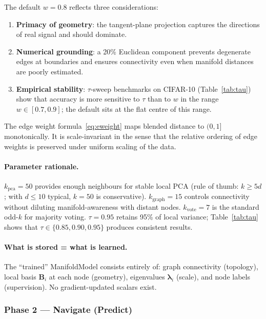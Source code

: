 \documentclass[12pt,letterpaper]{article}
\newcommand{\bB}{\mathbf{B}}
\begin{document}
The default $w{=}0.8$ reflects three considerations:
\begin{enumerate}[leftmargin=*,label=(\arabic*)]
  \item \textbf{Primacy of geometry}: the tangent-plane projection captures the
    directions of real signal and should dominate.
  \item \textbf{Numerical grounding}: a 20\% Euclidean component prevents
    degenerate edges at boundaries and ensures connectivity even when manifold
    distances are poorly estimated.
  \item \textbf{Empirical stability}: $\tau$-sweep benchmarks on CIFAR-10
    (Table~\ref{tab:tau}) show that accuracy is more sensitive to $\tau$ than to
    $w$ in the range $w \in [0.7, 0.9]$; the default sits at the flat centre of
    this range.
\end{enumerate}
The edge weight formula~\eqref{eq:eweight} maps blended distance to $(0,1]$
monotonically.  It is scale-invariant in the sense that the relative ordering of
edge weights is preserved under uniform scaling of the data.

\paragraph{Parameter rationale.}
$k_\text{pca}{=}50$ provides enough neighbours for stable local PCA
(rule of thumb: $k \ge 5d$; with $d \le 10$ typical, $k{=}50$ is
conservative).  $k_\text{graph}{=}15$ controls connectivity without diluting
manifold-awareness with distant nodes.  $k_\text{vote}{=}7$ is the standard odd-$k$
for majority voting.  $\tau{=}0.95$ retains 95\% of local variance;
Table~\ref{tab:tau} shows that $\tau \in \{0.85, 0.90, 0.95\}$ produces
consistent results.

\paragraph{What is stored = what is learned.}
The ``trained'' ManifoldModel consists entirely of: graph connectivity
(topology), local basis $\bB_i$ at each node (geometry), eigenvalues
$\bm\lambda_i$ (scale), and node labels (supervision).  No gradient-updated
scalars exist.

\subsubsection{Phase 2 --- Navigate (Predict)}
\end{document}
